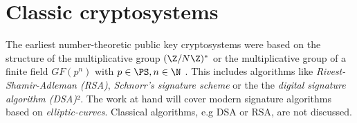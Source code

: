 \section{Classic cryptosystems}

The earliest number-theoretic public key cryptosystems were based on the structure of the multiplicative group $(\Z/N\Z)^*$ or the multiplicative group of a finite field $GF(p^n)$ with $p \in \PS, n \in \N$ \cite{bruce867}. This includes algorithms like \emph{Rivest-Shamir-Adleman (RSA)}, \emph{Schnorr's signature scheme} or the the \emph{digital signature algorithm (DSA)}². The work at hand will cover modern signature algorithms based on \emph{elliptic-curves}. Classical algorithms, e.g DSA or RSA, are not discussed.